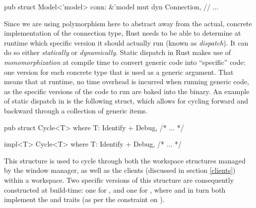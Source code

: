 \begin{rustblock}
  pub struct Model<'model> {
    conn: &'model mut dyn Connection,
    // ...
  }
\end{rustblock}


Since we are using polymorphism here to abstract away from the actual,
concrete implementation of the connection type, Rust needs to be able to
determine at runtime which specific version it should actually run (known as
\textit{dispatch})\cite{therustbook, rustblogtraits}. It can do so either
\textit{statically} or \textit{dynamically}. Static dispatch in Rust makes
use of \textit{monomorphization} at compile time to convert generic code into
``specific'' code: one version for each concrete type that is used as a generic
argument\cite{therustbook, rustblogtraits}. That means that at runtime, no time
overhead is incurred when running generic code, as the specific versions of the
code to run are baked into the binary\cite{therustbook, rustblogtraits}. An
example of static dispatch in \wmrs is the following  struct, which
allows for cycling forward and backward through a collection of generic items.

\begin{minipage}[t]{.45\linewidth}
\begin{rustblock}
pub struct Cycle<T>
where
  T: Identify + Debug,
{ /* ... */ }
\end{rustblock}
\end{minipage}%
\begin{minipage}[t]{.45\linewidth}
\begin{rustblock}
impl<T> Cycle<T>
where
    T: Identify + Debug,
{ /* ... */ }
\end{rustblock}
\end{minipage}

\vspace*{6pt}This structure is used to cycle through both the workspace
structures managed by the window manager, as well as the clients (discussed
in section \ref{clients}) within a workspace. Two specific versions
of this structure are consequently constructed at build-time: one
for , and one for , where
 and  in turn both implement the 
and  traits (as per the constraint on ).

